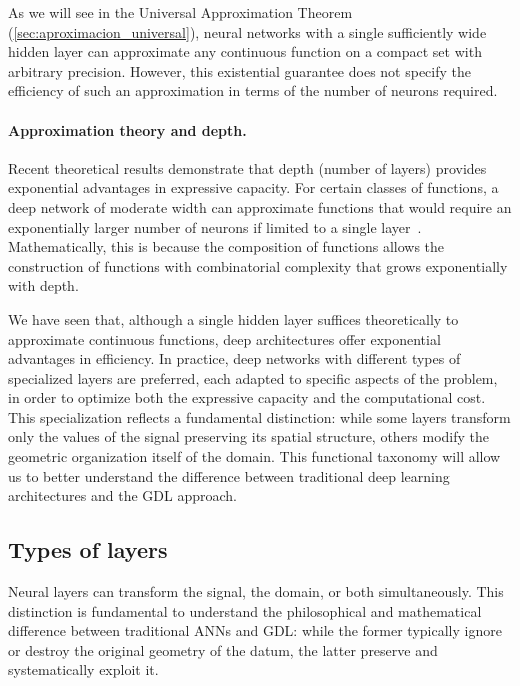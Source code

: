 As we will see in the Universal Approximation Theorem (\autoref{sec:aproximacion_universal}), neural networks with a single sufficiently wide hidden layer can approximate any continuous function on a compact set with arbitrary precision. However, this existential guarantee does not specify the efficiency of such an approximation in terms of the number of neurons required.

\paragraph{Approximation theory and depth.}

Recent theoretical results demonstrate that depth (number of layers) provides exponential advantages in expressive capacity. For certain classes of functions, a deep network of moderate width can approximate functions that would require an exponentially larger number of neurons if limited to a single layer~\citep{telgarsky2016benefitsdepthneuralnetworks}. Mathematically, this is because the composition of functions allows the construction of functions with combinatorial complexity that grows exponentially with depth.

We have seen that, although a single hidden layer suffices theoretically to approximate continuous functions, deep architectures offer exponential advantages in efficiency. In practice, deep networks with different types of specialized layers are preferred, each adapted to specific aspects of the problem, in order to optimize both the expressive capacity and the computational cost. This specialization reflects a fundamental distinction: while some layers transform only the values of the signal preserving its spatial structure, others modify the geometric organization itself of the domain. This functional taxonomy will allow us to better understand the difference between traditional deep learning architectures and the \gls{GDL} approach.

\subsection{Types of layers}\label{subsec:tipos_de_capas}

Neural layers can transform the signal, the domain, or both simultaneously. This distinction is fundamental to understand the philosophical and mathematical difference between traditional \glspl{ANN} and \gls{GDL}: while the former typically ignore or destroy the original geometry of the datum, the latter preserve and systematically exploit it.

